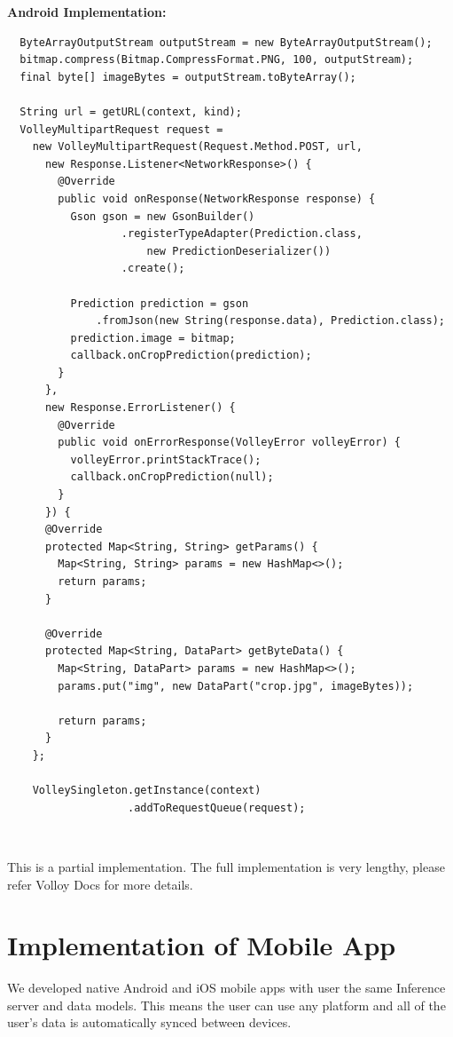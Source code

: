\documentclass[../Report.tex]{subfiles}
\begin{document}
\noindent \textbf{Android Implementation:}
\begin{verbatim}
  ByteArrayOutputStream outputStream = new ByteArrayOutputStream();
  bitmap.compress(Bitmap.CompressFormat.PNG, 100, outputStream);
  final byte[] imageBytes = outputStream.toByteArray();

  String url = getURL(context, kind);
  VolleyMultipartRequest request = 
    new VolleyMultipartRequest(Request.Method.POST, url,
      new Response.Listener<NetworkResponse>() {
        @Override
        public void onResponse(NetworkResponse response) {
          Gson gson = new GsonBuilder()
                  .registerTypeAdapter(Prediction.class, 
                      new PredictionDeserializer())
                  .create();

          Prediction prediction = gson
              .fromJson(new String(response.data), Prediction.class);
          prediction.image = bitmap;
          callback.onCropPrediction(prediction);
        }
      },
      new Response.ErrorListener() {
        @Override
        public void onErrorResponse(VolleyError volleyError) {
          volleyError.printStackTrace();
          callback.onCropPrediction(null);
        }
      }) {
      @Override
      protected Map<String, String> getParams() {
        Map<String, String> params = new HashMap<>();
        return params;
      }

      @Override
      protected Map<String, DataPart> getByteData() {
        Map<String, DataPart> params = new HashMap<>();
        params.put("img", new DataPart("crop.jpg", imageBytes));

        return params;
      }
    };
    
    VolleySingleton.getInstance(context)
                   .addToRequestQueue(request);
  \end{verbatim}
 ~\par

This is a partial implementation. The full implementation is very lengthy, please refer Volloy Docs for more details.

\section{Implementation of Mobile App}

We developed native Android and iOS mobile apps with user the same Inference server and data models. This means the user can use any platform
and all of the user's data is automatically synced between devices.
\end{document}
